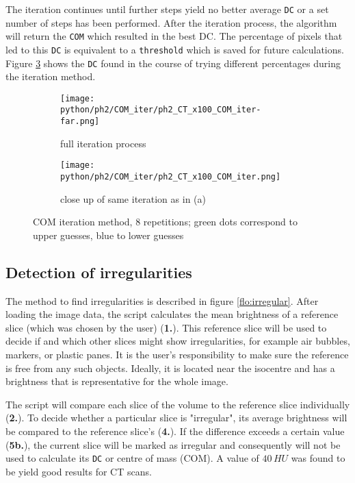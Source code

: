 The iteration continues until further steps yield no better average \texttt{DC} or a set number of steps has been performed.
After the iteration process, the algorithm will return the \texttt{COM} which resulted in the best DC.
The percentage of pixels that led to this \texttt{DC} is equivalent to a \texttt{threshold} which is saved for future calculations.
Figure \ref{fig:COM_iteration} shows the \texttt{DC}  found in the course of trying different percentages during the iteration method.


\begin{figure}[!thb]
\centering
  \begin{subfigure}[b]{1\textwidth}
  \centering
    \texttt{[image: python/ph2/COM\_iter/ph2\_CT\_x100\_COM\_iter-far.png]}
    \caption{full iteration process}
    \label{fig:CT_x100_iteration}
  \end{subfigure}
  \begin{subfigure}[b]{1\textwidth}
  \centering
    \texttt{[image: python/ph2/COM\_iter/ph2\_CT\_x100\_COM\_iter.png]}
     \caption{close up of same iteration as in (a)}
     \label{fig:MR_x100_iteration}
  \end{subfigure}
  \caption{COM iteration method, 8 repetitions; green dots correspond to upper guesses, blue to lower guesses}
  \label{fig:COM_iteration}
\end{figure}



\subsection{Detection of irregularities}

The method to find irregularities is described in figure \ref{flo:irregular}.
After loading the image data, the script calculates the mean brightness of a reference slice (which was chosen by the user) (\textbf{1.}).
This reference slice will be used to decide if and which other slices might show irregularities, for example air bubbles, markers, or plastic panes.
It is the user's responsibility to make sure the reference is free from any such objects.
Ideally, it is located near the isocentre and has a brightness that is representative for the whole image.

The script will compare each slice of the volume to the reference slice individually (\textbf{2.}).
To decide whether a particular slice is "irregular", its average brightness will be compared to the reference slice's (\textbf{4.}).
If the difference exceeds a certain value (\textbf{5b.}), the current slice will be marked as irregular and consequently will not be used to calculate its \texttt{DC} or centre of mass (COM).
A value of $40\,HU$ was found to be yield good results for CT scans.


